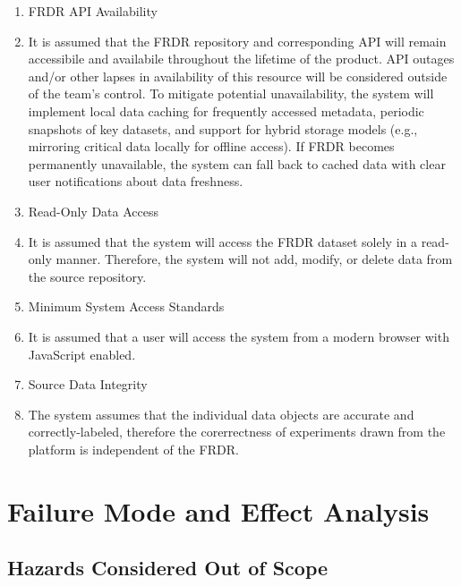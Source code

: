 \documentclass{article}
\begin{document}
\begin{enumerate}
    \item FRDR API Availability
    \item[] It is assumed that the FRDR repository and corresponding API will remain accessibile and availabile throughout the lifetime of the product. API outages and/or other lapses in availability of this resource will be considered outside of the team's control. To mitigate potential unavailability, the system will implement local data caching for frequently accessed metadata, periodic snapshots of key datasets, and support for hybrid storage models (e.g., mirroring critical data locally for offline access). If FRDR becomes permanently unavailable, the system can fall back to cached data with clear user notifications about data freshness. 
    \item Read-Only Data Access
    \item[] It is assumed that the system will access the FRDR dataset solely in a read-only manner. Therefore, the system will not add, modify, or delete data from the source repository. 
    \item Minimum System Access Standards
    \item[] It is assumed that a user will access the system from a modern browser with JavaScript enabled. 
    \item Source Data Integrity 
    \item [] The system assumes that the individual data objects are accurate and correctly-labeled, therefore the corerrectness of experiments drawn from the platform is independent of the FRDR. 
\end{enumerate}

\section{Failure Mode and Effect Analysis}

\subsection{Hazards Considered Out of Scope}
\end{document}
